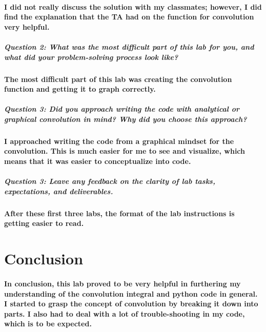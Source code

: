 \documentclass[12pt,a4paper]{article}
\begin{document}
\paragraph{I did not really discuss the solution with my classmates; however, I did find the explanation that the TA had on the function for convolution very helpful.}

\subparagraph{\large Question 2: What was the most difficult part of this lab for you, and what did your problem-solving
process look like?}

\paragraph{The most difficult part of this lab was creating the convolution function and getting it to graph correctly.}


\subparagraph{\large Question 3:  Did you approach writing the code with analytical or graphical convolution in mind? Why
did you choose this approach?}

\paragraph{I approached writing the code from a graphical mindset for the convolution. This is much easier for me to see and visualize, which means that it was easier to conceptualize into code. }

\subparagraph{\large Question 3: Leave any feedback on the clarity of lab tasks, expectations, and deliverables.}

\paragraph{After these first three labs, the format of the lab instructions is getting easier to read.}

\section{Conclusion}\label{sec:res}

\paragraph{In conclusion, this lab proved to be very helpful in furthering my understanding of the convolution integral and python code in general. I started to grasp the concept of convolution by breaking it down into parts. I also had to deal with a lot of trouble-shooting in my code, which is to be expected.}




\end{document}
